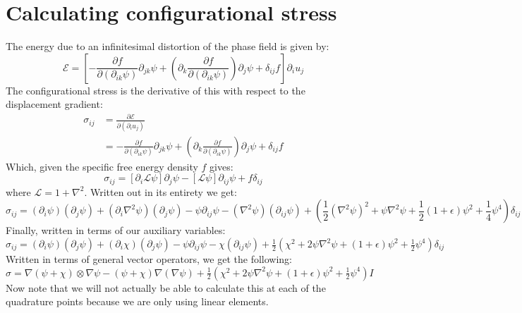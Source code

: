 \documentclass[reqno]{article}
\begin{document}
\section{Calculating configurational stress}
The energy due to an infinitesimal distortion of the phase field is given by:
\begin{equation}
    \mathcal{E}
    =
    \left[
        -\frac{\partial f}{\partial (\partial_{ik} \psi)} \partial_{jk} \psi
        + \left(\partial_k \frac{\partial f}{\partial (\partial_{ik}\psi)}\right) \partial_j \psi
        + \delta_{ij} f
    \right]
    \partial_i u_j
\end{equation}
The configurational stress is the derivative of this with respect to the displacement gradient:
\begin{equation} \label{eq:configurational-stress}
    \begin{split}
        \sigma_{ij}
        &=
        \frac{\partial \mathcal{E}}{\partial (\partial_i u_j)} \\
        &=
        -\frac{\partial f}{\partial (\partial_{ik} \psi)} \partial_{jk} \psi
        + \left(\partial_k \frac{\partial f}{\partial (\partial_{ik}\psi)}\right) \partial_j \psi
        + \delta_{ij} f
    \end{split}
\end{equation}
Which, given the specific free energy density $f$ gives:
\begin{equation}
    \sigma_{ij}
    =
    \left[\partial_i \mathcal{L} \psi \right] \partial_j \psi
    - \left[ \mathcal{L} \psi \right] \partial_{ij} \psi
    + f \delta_{ij}
\end{equation}
where $\mathcal{L} = 1 + \nabla^2$.
Written out in its entirety we get:
\begin{equation}
    \sigma_{ij}
    =
    (\partial_i \psi) (\partial_j \psi)
    + (\partial_i \nabla^2 \psi) (\partial_j \psi)
    - \psi \partial_{ij} \psi
    - (\nabla^2 \psi) (\partial_{ij} \psi)
    + \left( \frac12 \left(\nabla^2 \psi\right)^2 + \psi \nabla^2 \psi 
    + \frac12 (1 + \epsilon) \psi^2 + \frac14 \psi^4 \right) \delta_{ij}
\end{equation}
Finally, written in terms of our auxiliary variables:
\begin{equation}
    \sigma_{ij}
    =
    (\partial_i \psi) (\partial_j \psi)
    + (\partial_i \chi) (\partial_j \psi)
    - \psi \partial_{ij} \psi
    - \chi (\partial_{ij} \psi)
    + \tfrac12 \left(\chi^2 + 2 \psi \nabla^2 \psi + (1 + \epsilon) \psi^2 + \tfrac12 \psi^4 \right)\delta_{ij}
\end{equation}
Written in terms of general vector operators, we get the following:
\begin{equation}
    \sigma
    =
    \nabla \left(\psi + \chi \right) \otimes \nabla \psi
    - (\psi + \chi) \nabla(\nabla \psi)
    + \tfrac12 \left(\chi^2 + 2 \psi \nabla^2 \psi + (1 + \epsilon) \psi^2 + \tfrac12 \psi^4 \right) I
\end{equation}
Now note that we will not actually be able to calculate this at each of the quadrature points because we are only using linear elements.
\end{document}
